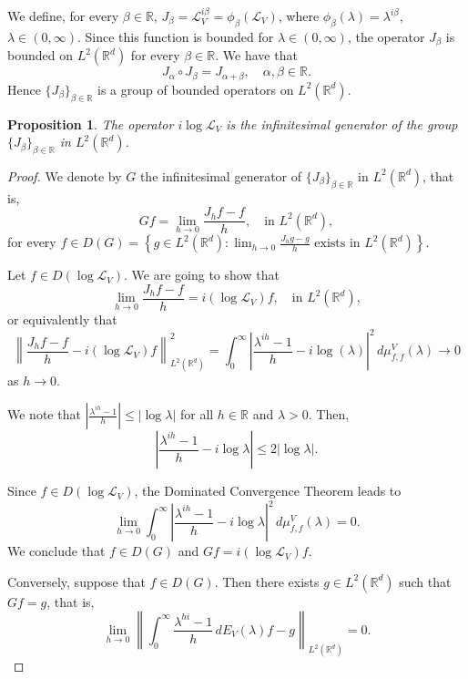 \documentclass[10pt, a4paper, reqno]{amsart}
\newtheorem{prop}[thm]{Proposition}
\theoremstyle{definition}
\theoremstyle{remark}
\numberwithin{equation}{section}
\begin{document}
We define, for every $\beta \in \mathbb{R}$, $J_\beta = \mathcal{L}_V^{i\beta}=\phi_\beta(\mathcal{L}_V)$, where $\phi_\beta(\lambda)=\lambda^{i\beta}$, $\lambda\in (0,\infty)$. Since this function is bounded for $\lambda \in (0,\infty)$, the operator $J_\beta$ is bounded on $L^2(\mathbb{R}^d)$ for every $\beta \in \mathbb{R}$. We have that 
\[
J_\alpha \circ J_\beta = J_{\alpha + \beta}, \quad \alpha, \beta \in \mathbb{R}.
\]
Hence $\{J_\beta\}_{\beta \in \mathbb{R}}$ is a group of bounded operators on $L^2(\mathbb{R}^d)$.
\begin{prop}\label{propo: 2.2}
    The operator $i\log \mathcal{L}_V$ is the infinitesimal generator of the group $\{J_\beta\}_{\beta \in \mathbb{R}}$ in $L^2(\mathbb{R}^d)$. 
\end{prop}
\begin{proof}
    We denote by $G$ the infinitesimal generator of $\{J_\beta\}_{\beta \in \mathbb{R}}$ in $L^2(\mathbb{R}^d)$, that is, 
    \[
    Gf = \lim_{h \rightarrow 0} \frac{J_h f - f}{h}, \quad \text{in } L^2(\mathbb{R}^d),
    \]
    for every $\displaystyle f \in D(G) = \left\{ g \in L^2(\mathbb{R}^d) : \lim_{h \rightarrow 0} \frac{J_h g - g}{h} \text{ exists in } L^2(\mathbb{R}^d) \right\}$.

    Let $f \in D(\log \mathcal{L}_V)$. We are going to show that
    \[
    \lim_{h \rightarrow 0} \frac{J_h f - f}{h} = i(\log \mathcal{L}_V) f, \quad \text{in } L^2(\mathbb{R}^d),
    \]
    or equivalently that
    \[
    \left\| \frac{J_h f - f}{h} - i(\log \mathcal{L}_V) f \right\|_{L^2(\mathbb{R}^d)}^2 = 
    \int_0^\infty \left| \frac{\lambda^{ih}-1}{h} - i\log(\lambda)\right|^2 \, d\mu_{f,f}^V(\lambda) \rightarrow 0 
    \]
    as $h \rightarrow 0$. 

    We note that $\left| \frac{\lambda^{ih}-1}{h}\right| \leq |\log \lambda|$ for all $h \in \mathbb{R}$ and $\lambda > 0$. Then, 
    \[
    \left| \frac{\lambda^{ih}-1}{h} - i\log\lambda \right| \leq 2 |\log\lambda|. 
    \]

    Since $f \in D(\log \mathcal{L}_V)$, the Dominated Convergence Theorem leads to 
    \[
    \lim_{h \rightarrow 0} \int_0^\infty \left| \frac{\lambda^{ih}-1}{h} - i\log\lambda \right|^2 \, d\mu_{f,f}^V(\lambda) = 0. 
    \]
    We conclude that $f \in D(G)$ and $Gf = i(\log\mathcal{L}_V) f$.

    Conversely, suppose that $f \in D(G)$. Then there exists $g \in L^2(\mathbb{R}^d)$ such that $Gf = g$, that is,
    \[
    \lim_{h \rightarrow 0} \left\| \int_0^\infty \frac{\lambda^{hi}-1}{h} \, dE_V(\lambda) f - g \right\|_{L^2(\mathbb{R}^d)} = 0.
    \]


\end{proof}
\end{document}

